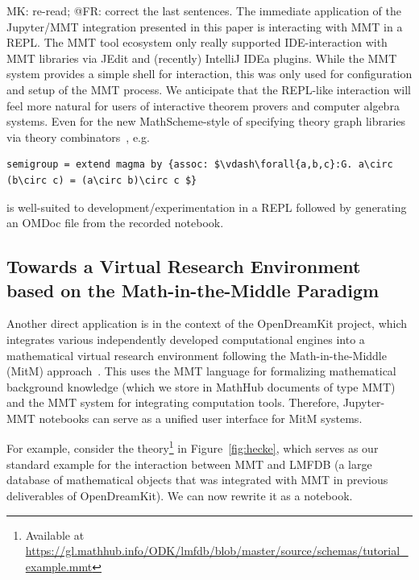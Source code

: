 \begin{newpart}{MK: re-read; @FR: correct the last sentences.}
  The immediate application of the Jupyter/MMT integration presented in this paper is interacting with MMT in a REPL.
  The MMT tool ecosystem only really supported IDE-interaction with MMT libraries via JEdit and (recently) IntelliJ IDEa plugins. 
  While the MMT system provides a simple shell for interaction, this was only used for configuration and setup of the MMT process.
  We anticipate that the REPL-like interaction will feel more natural for users of interactive theorem provers and computer algebra systems.
  Even for the new MathScheme-style of specifying theory graph libraries via theory combinators~\cite{ShaRab:dcm19}, e.g. 
\begin{lstlisting}[mathescape]
semigroup = extend magma by {assoc: $\vdash\forall{a,b,c}:G. a\circ (b\circ c) = (a\circ b)\circ c $}
\end{lstlisting}
  is well-suited to development/experimentation in a REPL followed by generating an OMDoc file from the recorded notebook.
\end{newpart}

\subsection{Towards a Virtual Research Environment based on the Math-in-the-Middle Paradigm}


Another direct application is in the context of the OpenDreamKit project, which integrates various independently developed computational engines into a mathematical virtual research environment following the Math-in-the-Middle (MitM) approach~\cite{DehKohKon:iop16}.
This uses the MMT language for formalizing mathematical background knowledge (which we store in MathHub documents of type MMT) and the MMT system for integrating computation tools.
Therefore, Jupyter-MMT notebooks can serve as a unified user interface for MitM systems.

For example, consider the theory\footnote{Available at \url{https://gl.mathhub.info/ODK/lmfdb/blob/master/source/schemas/tutorial_example.mmt}}  in Figure~\ref{fig:hecke}, which serves as our standard example for the interaction between MMT and LMFDB (a large database of mathematical objects that was integrated with MMT in previous deliverables of OpenDreamKit).
We can now rewrite it as a notebook.

